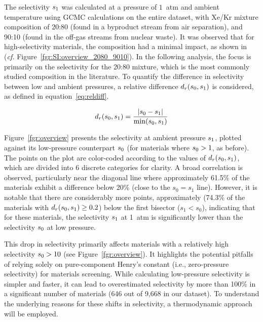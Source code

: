 \documentclass[main.tex]{subfiles}
\begin{document}
The selectivity $s_{\text{1}}$ was calculated at a pressure of $1$~atm and ambient temperature using GCMC calculations on the entire dataset, with Xe/Kr mixture composition of 20:80 (found in a byproduct stream from air separation\autocite{kerry2007industrial}), and 90:10 (found in the off-gas streams from nuclear waste\autocite{auerbach2003handbook}). It was observed that for high-selectivity materials, the composition had a minimal impact, as shown in (\emph{cf.} Figure~\ref{fgr:SI:overview_2080_9010}). In the following analysis, the focus is primarily on the selectivity for the 20:80 mixture, which is the most commonly studied composition in the literature. To quantify the difference in selectivity between low and ambient pressures, a relative difference $d_r(s_{\text{0}},s_{\text{1}})$ is considered, as defined in equation~\ref{eq:reldiff}.

\begin{equation}\label{eq:reldiff}
    d_r(s_{\text{0}},s_{\text{1}}) = \dfrac{\lvert s_{\text{0}} - s_{\text{1}} \rvert}{\min(s_{\text{0}},s_{\text{1}})}
\end{equation}

Figure~\ref{fgr:overview} presents the selectivity at ambient pressure $s_{\text{1}}$, plotted against its low-pressure counterpart $s_{\text{0}}$ (for materials where $s_{\text{0}} > 1$, as before). The points on the plot are color-coded according to the values of $d_r(s_{\text{0}},s_{\text{1}})$, which are divided into 6 discrete categories for clarity. A broad correlation is observed, particularly near the diagonal line where approximately {61.5\%} of the materials exhibit a difference below {20\%} (close to the $s_0 = s_1$ line). 
However, it is notable that there are considerably more points, approximately ({74.3\%} of the materials with $d_r(s_{\text{0}},s_{\text{1}})\ge 0.2$) below the first bisector ($s_1 < s_0$), indicating that for these materials, the selectivity $s_{\text{1}}$ at 1~atm is significantly lower than the selectivity $s_{\text{0}}$ at low pressure.

This drop in selectivity primarily affects materials with a relatively high selectivity $s_{\text{0}} > 10$ (see Figure~\ref{fgr:overview}). It highlights the potential pitfalls of relying solely on pure-component Henry's constant (i.e., zero-pressure selectivity) for materials screening. While calculating low-pressure selectivity is simpler and faster, it can lead to overestimated selectivity by more than {100\%} in a significant number of materials (646 out of 9,668 in our dataset). To understand the underlying reasons for these shifts in selectivity, a thermodynamic approach will be employed.
\end{document}
